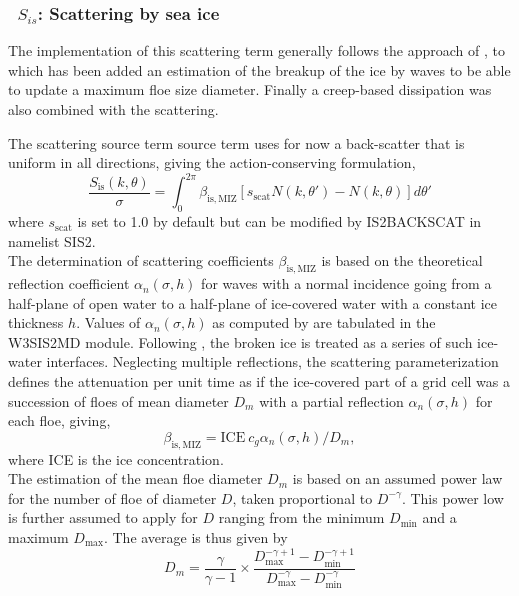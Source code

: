 \vsssub
\subsubsection{~$S_{is}$: Scattering by sea ice} \label{sec:IS2}
\vsssub


\noindent
The implementation of this scattering term generally 
follows the approach of \cite{art:MM06}, to which has been added an estimation of the breakup of the ice 
by waves to be able to update a maximum floe size diameter. Finally a creep-based dissipation was also 
combined with the scattering.  

\noindent 
The scattering source term source term uses for now a back-scatter that is uniform in 
all directions,  giving the action-conserving formulation, 
\begin{equation}
 \frac{S_{\mathrm{is}}(k,\theta)}{\sigma} =  \int_0^{2\pi}\beta_{\mathrm{is},\mathrm{MIZ}} [s_\mathrm{scat}  N(k,\theta')-N(k,\theta)] d\theta'  
 \end{equation}
where $s_\mathrm{scat}$ is set to 1.0 by default but can be modified by 
{\code IS2BACKSCAT} in namelist SIS2. \\

\noindent
The determination of scattering coefficients  $\beta_{\mathrm{is},\mathrm{MIZ}}$ is based on the theoretical 
reflection coefficient $\alpha_n(\sigma,h)$
for waves with a normal incidence going from a half-plane of open water to a half-plane of ice-covered water with a 
constant ice thickness $h$.  Values of $\alpha_n(\sigma,h)$ as computed by \cite{art:KM08} are tabulated 
in the {\code W3SIS2MD} module. Following \cite{art:Dea11}, the broken ice is treated as a series of 
such ice-water interfaces. Neglecting multiple reflections, the scattering parameterization defines the attenuation 
per unit time as if the ice-covered part of a grid cell was a succession of floes of mean diameter $D_{m}$ with a partial 
reflection $\alpha_n(\sigma,h)$ for each floe, giving, 
\begin{equation}
\beta_{\mathrm{is},\mathrm{MIZ}}=\mathrm{ICE}~c_g \alpha_n(\sigma,h) / D_{m},
 \end{equation}
where ICE is the ice concentration. \\
 
\noindent
The estimation of the mean floe diameter $D_m$ is based on an assumed power law for the number of 
floe of diameter $D$, taken  proportional to $D^{-\gamma}$. This power low is further assumed to 
apply for $D$ ranging from 
the minimum $D_{\min}$ and a maximum $D_{\max}$. The average is thus given by  
\begin{equation}
D_m=\frac{\gamma}{\gamma -1}\times\frac{D_{\max}^{-\gamma +1}-D_{\min}^{-\gamma +1}}{D_{\max}^{-\gamma}-D_{\min}^{-\gamma}}
\label{analytic_Dbar}
\end{equation}

